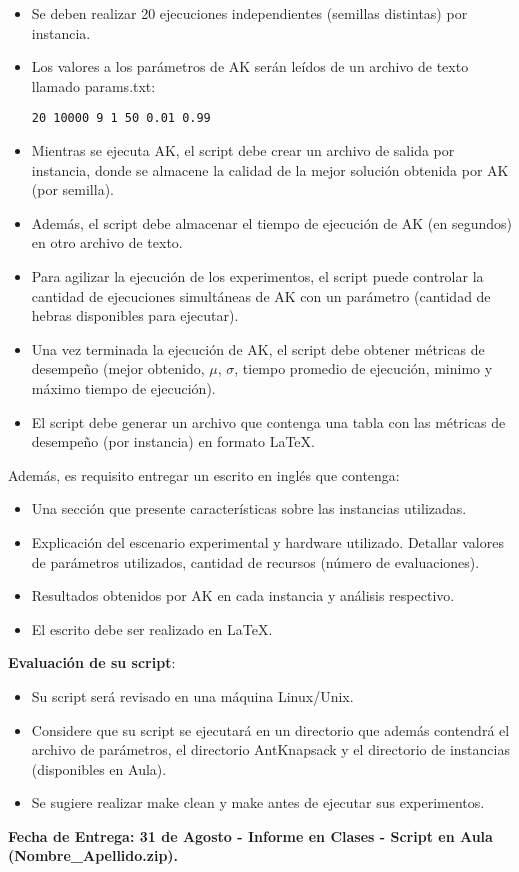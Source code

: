 \documentclass[12pt,spanish,letter]{article}
\begin{document}
\begin{itemize}
\item Se deben realizar 20 ejecuciones independientes (semillas distintas) por instancia.
\item Los valores a los par\'ametros de AK ser\'an le\'idos de un archivo de texto llamado params.txt:
\begin{verbatim}
20 10000 9 1 50 0.01 0.99
\end{verbatim}
\item Mientras se ejecuta AK, el script debe crear un archivo de salida por instancia, donde se almacene la calidad de la mejor soluci\'on obtenida por AK (por semilla).
\item Adem\'as, el script debe almacenar el tiempo de ejecuci\'on de AK (en segundos) en otro archivo de texto.
\item Para agilizar la ejecuci\'on de los experimentos, el script puede controlar la cantidad de ejecuciones simult\'aneas de AK con un par\'ametro (cantidad de hebras disponibles para ejecutar).
\item Una vez terminada la ejecuci\'on de AK, el script debe obtener m\'etricas de desempe\~no (mejor obtenido, $\mu$, $\sigma$, tiempo promedio de ejecuci\'on, minimo y m\'aximo tiempo de ejecuci\'on).
\item El script debe generar un archivo que contenga una tabla con las m\'etricas de desempe\~no (por instancia) en formato \LaTeX.
\end{itemize}

Adem\'as, es requisito entregar un escrito en ingl\'es que contenga:
\begin{itemize}
\item Una secci\'on que presente caracter\'isticas sobre las instancias utilizadas.
\item Explicaci\'on del escenario experimental y hardware utilizado. Detallar valores de par\'ametros utilizados, cantidad de recursos (n\'umero de evaluaciones).
\item Resultados obtenidos por AK en cada instancia y an\'alisis respectivo.
\item El escrito debe ser realizado en \LaTeX.
\end{itemize}

\textbf{Evaluaci\'on de su script}:
\begin{itemize}
\item Su script ser\'a revisado en una m\'aquina Linux/Unix.
\item Considere que su script se ejecutar\'a en un directorio que adem\'as contendr\'a el archivo de par\'ametros, el directorio AntKnapsack y el directorio de instancias (disponibles en Aula).
\item Se sugiere realizar make clean y make antes de ejecutar sus experimentos.
\end{itemize}

\textbf{Fecha de Entrega: 31 de Agosto - Informe en Clases - Script en Aula (Nombre\_Apellido.zip).}
\end{document}
